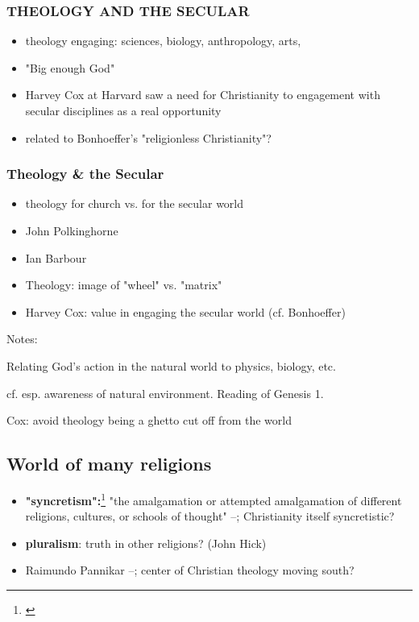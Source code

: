 \documentclass[11pt]{article}
\begin{document}
\subsubsection*{THEOLOGY AND THE SECULAR}
\label{theology-and-the-secular}
\begin{itemize}
\item theology engaging: sciences, biology, anthropology, arts,
\item "Big enough God"
\item Harvey Cox at Harvard saw a need for Christianity to engagement with secular disciplines as a real opportunity
\item related to Bonhoeffer's "religionless Christianity"?
\end{itemize}

\subsubsection*{Theology \& the Secular}
\label{theology--the-secular}
\begin{itemize}
\item theology for church vs. for the secular world
\item John Polkinghorne
\item Ian Barbour
\item Theology: image of "wheel" vs. "matrix"
\item Harvey Cox: value in engaging the secular world (cf. Bonhoeffer)
\end{itemize}
\begin{NOTES}


Notes:

Relating God's action in the natural world to physics, biology, etc.

cf. esp. awareness of natural environment. Reading of Genesis 1.

Cox: avoid theology being a ghetto cut off from the world 
\end{NOTES}
\subsection*{World of many religions}
\label{world-of-many-religions}
\begin{itemize}
\item \textbf{"syncretism":}\footnote{\citep{placherHistoryChristianTheology2013}} "the amalgamation or attempted amalgamation of different religions, cultures, or schools of thought" --; Christianity itself syncretistic?
\item \textbf{pluralism}: truth in other religions? (John Hick)
\item Raimundo Pannikar --; center of Christian theology moving south?
\end{itemize}
\end{document}
